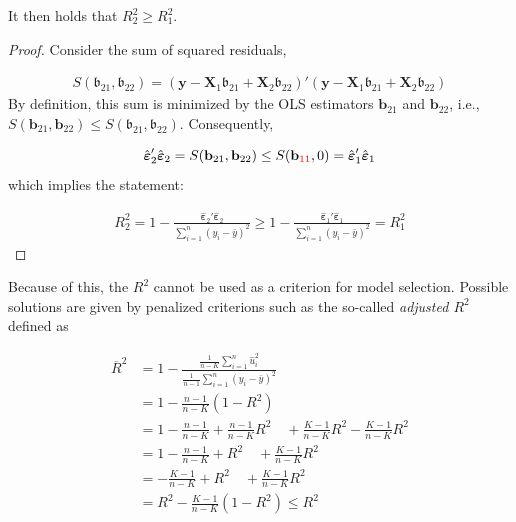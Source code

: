 \documentclass[]{book}
\theoremstyle{definition}
\theoremstyle{definition}
\theoremstyle{definition}
\theoremstyle{remark}
\let\BeginKnitrBlock\begin \let\EndKnitrBlock\end
\begin{document}
It then holds that \(R^2_2\geq R^2_1\).

\BeginKnitrBlock{proof}
{}Consider the sum of squared residuals,

\begin{align*}
S(\mathbf{\mathfrak{b}}_{21},\mathbf{\mathfrak{b}}_{22})=(\mathbf{y}-\mathbf{X}_1\mathbf{\mathfrak{b}}_{21}+\mathbf{X}_2\mathbf{\mathfrak{b}}_{22})'(\mathbf{y}-\mathbf{X}_1\mathbf{\mathfrak{b}}_{21}+\mathbf{X}_2\mathbf{\mathfrak{b}}_{22})
\end{align*}
By definition, this sum is minimized by the OLS estimators \(\mathbf{b}_{21}\)
and \(\mathbf{b}_{22}\), i.e.,
\(S(\mathbf{b}_{21},\mathbf{b}_{22})\leq S(\mathbf{\mathfrak{b}}_{21},\mathbf{\mathfrak{b}}_{22})\).
Consequently,

\begin{align*}
\hat{\boldsymbol{\varepsilon}}_{2}'\hat{\boldsymbol{\varepsilon}}_{2}=S(\mathbf{b}_{21},\mathbf{b}_{22})\leq S(\mathbf{b}_{{\color{red}11}},0)=\hat{\boldsymbol{\varepsilon}}_{1}'\hat{\boldsymbol{\varepsilon}}_{1}
\end{align*}
which implies the statement:

\begin{align*}
R_2^2=1-\frac{\hat{\boldsymbol{\varepsilon}}_{2}'\hat{\boldsymbol{\varepsilon}}_{2}}{\sum_{i=1}^n\left(y_i-\bar{y}\right)^2}\geq
1-\frac{\hat{\boldsymbol{\varepsilon}}_{1}'\hat{\boldsymbol{\varepsilon}}_{1}}{\sum_{i=1}^n\left(y_i-\bar{y}\right)^2}=R_1^2
\end{align*}
\EndKnitrBlock{proof}

Because of this, the \(R^2\) cannot be used as a criterion for model
selection. Possible solutions are given by penalized criterions such as
the so-called \emph{adjusted \(R^2\)} defined as

\[
\begin{align*}
  \overline{R}^2 &= 1-\frac{ \frac{1}{n-K} \sum_{i=1}^n \hat{u}_i^2}{ \frac{1}{n-1} \sum_{i=1}^n \left(y_i-\bar{y}\right)^2} \\
   &= 1-\frac{n-1}{n-K}\left(1-R^2\right) \\
    &= 1-\frac{n-1}{n-K}+\frac{n-1}{n-K}R^2\quad+\frac{K-1}{n-K}R^2-\frac{K-1}{n-K}R^2 \\
    &= 1-\frac{n-1}{n-K}+R^2\quad+\frac{K-1}{n-K}R^2 \\
    &= -\frac{K-1}{n-K}+R^2\quad+\frac{K-1}{n-K}R^2 \\
   &= R^2-\frac{K-1}{n-K}\left(1-R^2\right) \leq R^2
\end{align*}
\]
\end{document}
